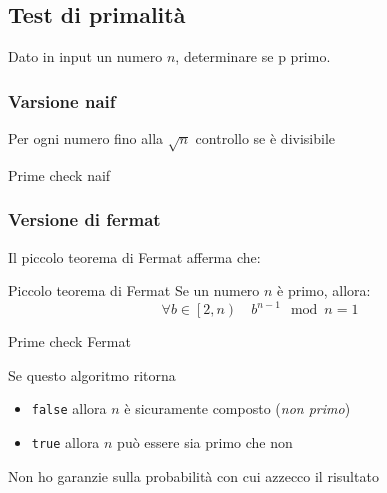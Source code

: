 \subsection{Test di primalità}
Dato in input un numero $ n $, determinare se p primo.

\subsubsection{Varsione naif}
Per ogni numero fino alla $ \sqrt{n} $ controllo se è divisibile
\vskip3mm
\begin{algoritmo}{Prime check naif}
	\begin{algorithm}[H]
		\caption{Prime Check (Naive Implementation)}
	\end{algorithm}
\end{algoritmo}

\subsubsection{Versione di fermat}
Il piccolo teorema di Fermat afferma che:
\begin{teorema}{Piccolo teorema di Fermat}
	Se un numero $ n $ è primo, allora:
	\[
		\forall b \in \left[2, n\right) \quad b^{n-1} \mod n  = 1
	\]
\end{teorema}
\vskip3mm
\begin{algoritmo}{Prime check Fermat}
	\begin{algorithm}[H]
		\caption{Probabilistic Prime Check (Fermat's Test)}
	\end{algorithm}
\end{algoritmo}
Se questo algoritmo ritorna
\begin{itemize}
	\item \verb|false| allora $ n $ è sicuramente composto (\textit{non primo})
	\item \verb|true| allora $ n $ può essere sia primo che non
\end{itemize}
Non ho garanzie sulla probabilità con cui azzecco il risultato

